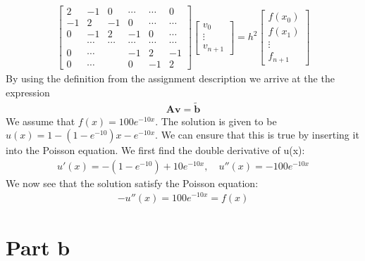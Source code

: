 \documentclass[american,a4paper,12pt]{article}
\renewcommand{\vec}[1]{\mathbf{#1}} %
\begin{document}
\begin{align*}
      \begin{bmatrix}
        2 & -1 & 0 & \cdots & \cdots & 0 \\
        -1 & 2 & -1 & 0 & \cdots & \cdots \\
        0 & -1 & 2 & -1 & 0 & \cdots \\
         & \cdots & \cdots & \cdots & \cdots & \cdots \\
        0 & \cdots & & -1 & 2 & -1 \\
        0 & \cdots & & 0 & -1 & 2
      \end{bmatrix}
      \begin{bmatrix}
        v_0 \\
        \vdots \\
        v_{n+1}
      \end{bmatrix}
= h^2
      \begin{bmatrix}
        f(x_0) \\
        f(x_1) \\
        \vdots \\
        f_{n+1}
      \end{bmatrix}
\end{align*}
By using the definition from the assignment description we arrive at the the expression
\begin{align*}
  \vec{A}\vec{v} = \vec{\tilde{b}}
\end{align*}
We assume that $f(x) = 100e^{-10x}$. The solution is given to be $u(x) = 1 - (1 - e^{-10})x - e^{-10x}$. We can ensure that this is true by inserting it into the Poisson equation. We first find the double derivative of u(x):
\begin{align*}
  u'(x) = -(1 - e^{-10}) + 10e^{-10x}, \quad u''(x) = -100e^{-10x}
\end{align*}
We now see that the solution satisfy the Poisson equation:
\begin{align*}
  -u''(x) = 100e^{-10x} = f(x)
\end{align*}

\section{Part b}
\end{document}
